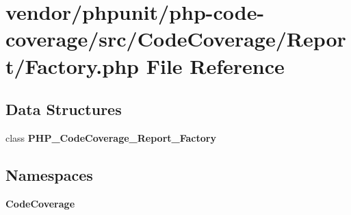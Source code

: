 \section{vendor/phpunit/php-\/code-\/coverage/src/\+Code\+Coverage/\+Report/\+Factory.php File Reference}
\label{phpunit_2php-code-coverage_2src_2_code_coverage_2_report_2_factory_8php}
\subsection*{Data Structures}
\begin{DoxyCompactItemize}
\item 
class {\bf P\+H\+P\+\_\+\+Code\+Coverage\+\_\+\+Report\+\_\+\+Factory}
\end{DoxyCompactItemize}
\subsection*{Namespaces}
\begin{DoxyCompactItemize}
\item 
 {\bf Code\+Coverage}
\end{DoxyCompactItemize}

